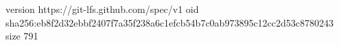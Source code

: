version https://git-lfs.github.com/spec/v1
oid sha256:eb8f2d32ebbf2407f7a35f238a6c1efcb54b7c0ab973895c12cc2d53c8780243
size 791
